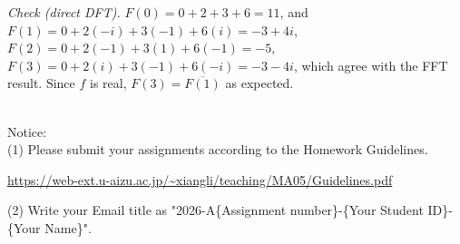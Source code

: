 \documentclass[12pt]{scrartcl}
\begin{document}
\begin{enumerate}
\emph{Check (direct DFT).} $F(0)=0+2+3+6=11$, and
$F(1)=0+2(-i)+3(-1)+6(i)=-3+4i$, $F(2)=0+2(-1)+3(1)+6(-1)=-5$,
$F(3)=0+2(i)+3(-1)+6(-i)=-3-4i$, which agree with the FFT result.
Since $f$ is real, $F(3)=\overline{F(1)}$ as expected.

\\
Notice: \\
(1) Please submit your assignments according to the Homework Guidelines.

\url{https://web-ext.u-aizu.ac.jp/~xiangli/teaching/MA05/Guidelines.pdf}

(2) Write your Email title as "2026-A\{Assignment number\}-\{Your Student ID\}-\{Your Name\}".


\end{enumerate}
\end{document}
